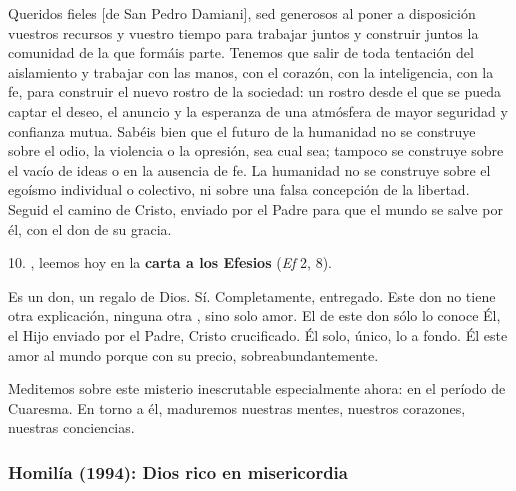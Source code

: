 \begin{body}
Queridos fieles [de San Pedro Damiani], sed generosos al poner a disposición vuestros recursos y vuestro tiempo para trabajar juntos y construir juntos la comunidad de la que formáis parte. Tenemos que salir de toda tentación del aislamiento y trabajar con las manos, con el corazón, con la inteligencia, con la fe, para construir el nuevo rostro de la sociedad: un rostro desde el que se pueda captar el deseo, el anuncio y la esperanza de una atmósfera de mayor seguridad y confianza mutua. Sabéis bien que el futuro de la humanidad no se construye sobre el odio, la violencia o la opresión, sea cual sea; tampoco se construye sobre el vacío de ideas o en la ausencia de fe. La humanidad no se construye sobre el egoísmo individual o colectivo, ni sobre una falsa concepción de la libertad. Seguid el camino de Cristo, enviado por el Padre para que el mundo se salve por él, con el don de su gracia.

10. , leemos hoy en la \textbf{carta a los Efesios} (\textit{Ef} 2, 8).

Es un don, un regalo de Dios. Sí. Completamente,  entregado. Este don no tiene otra explicación, ninguna otra , sino solo amor. El  de este don sólo lo conoce Él, el Hijo enviado por el Padre, Cristo crucificado. Él solo, único, lo  a fondo. Él  este amor al mundo porque  con su precio, sobreabundantemente.

Meditemos sobre este misterio inescrutable especialmente ahora: en el período de Cuaresma. En torno a él, maduremos nuestras mentes, nuestros corazones, nuestras conciencias.
\end{body}

\newpage

\subsubsection{Homilía (1994): Dios rico en misericordia}


